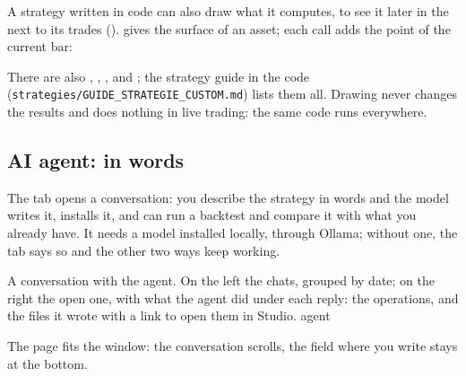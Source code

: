 A strategy written in code can also draw what it computes, to see it later
in the  next to its trades ().
 gives the surface of an asset; each call adds the point
of the current bar:


\noindent
There are also , , ,  and
; the strategy guide in the code
(\texttt{strategies/GUIDE\_STRATEGIE\_CUSTOM.md}) lists them all. Drawing never
changes the results and does nothing in live trading: the same code runs
everywhere.

\subsection{AI agent: in words}\label{sez:studio-agent}

The  tab opens a conversation: you describe the strategy in
words and the model writes it, installs it, and can run a backtest and
compare it with what you already have. It needs a model installed locally,
through Ollama; without one, the tab says so and the other two ways keep
working.

  {A conversation with the agent. On the left the chats, grouped by date; on
   the right the open one, with what the agent did under each reply: the
   operations, and the files it wrote with a link to open them in Studio.}
  {agent}

\noindent
The page fits the window: the conversation scrolls, the field where you
write stays at the bottom.

